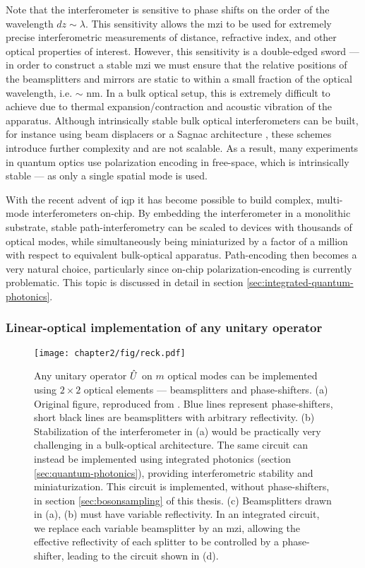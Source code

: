 Note that the interferometer is sensitive to phase shifts on the order of the wavelength $dz \sim \lambda$. This sensitivity allows the \gls{mzi} to be used for extremely precise interferometric measurements of distance, refractive index, and other optical properties of interest. 
However, this sensitivity is a double-edged sword --- in order to construct a stable \gls{mzi} we must ensure that the relative positions of the beamsplitters and mirrors are static to within a small fraction of the optical wavelength, i.e. $\sim$ nm. In a bulk optical setup, this is extremely difficult to achieve due to thermal expansion/contraction and acoustic vibration of the apparatus. Although intrinsically stable bulk optical interferometers can be built, for instance using beam displacers \cite{Martin-Lopez2012} or a Sagnac architecture \cite{OBrien2003}, these schemes introduce further complexity and are not scalable. As a result, many experiments in quantum optics use polarization encoding in free-space, which is intrinsically stable --- as only a single spatial mode is used. 

With the recent advent of \gls{iqp} it has become possible to build complex, multi-mode interferometers on-chip. By embedding the interferometer in a monolithic substrate, stable path-interferometry can be scaled to devices with thousands of optical modes, while simultaneously being miniaturized by a factor of a million \cite{Silverstone2013} with respect to equivalent bulk-optical apparatus. 
Path-encoding then becomes a very natural choice, particularly since on-chip polarization-encoding is currently problematic.  This topic is discussed in detail in section \ref{sec:integrated-quantum-photonics}.




\subsubsection{Linear-optical implementation of any unitary operator}
\label{sec:reck-scheme}
\begin{figure}[t!]
\centering
\texttt{[image: chapter2/fig/reck.pdf]}
\caption[Linear-optical implementation of any unitary operator]{
Any unitary operator $\hat{U}$ on $m$ optical modes can be implemented using $2\times 2$ optical elements --- beamsplitters and phase-shifters. (a) Original figure, reproduced from \cite{Reck1994}. Blue lines represent phase-shifters, short black lines are beamsplitters with arbitrary reflectivity. 
(b) Stabilization of the interferometer in (a) would be practically very challenging in a bulk-optical architecture. The same circuit can instead be implemented using integrated photonics (section \ref{sec:quantum-photonics}), providing interferometric stability and miniaturization. This circuit is implemented, without phase-shifters, in section \ref{sec:bosonsampling} of this thesis. (c) Beamsplitters drawn in (a), (b) must have variable reflectivity. In an integrated circuit, we replace each variable beamsplitter by an \gls{mzi}, allowing the effective reflectivity of each splitter to be controlled by a phase-shifter, leading to the circuit shown in (d).
}
\label{fig:reck-scheme}
\end{figure}
%

